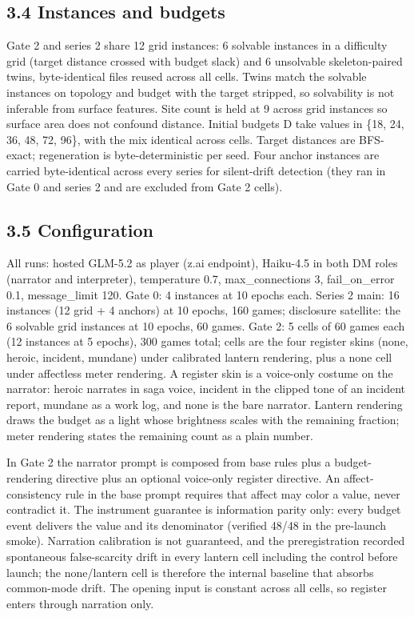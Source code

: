 \documentclass[11pt]{article}
\begin{document}
\subsection*{3.4 Instances and budgets}

Gate 2 and series 2 share 12 grid instances: 6 solvable instances in a
difficulty grid (target distance crossed with budget slack) and 6
unsolvable skeleton-paired twins, byte-identical files reused across all
cells. Twins match the solvable instances on topology and budget with
the target stripped, so solvability is not inferable from surface
features. Site count is held at 9 across grid instances so surface area
does not confound distance. Initial budgets D take values in \{18, 24,
36, 48, 72, 96\}, with the mix identical across cells. Target distances
are BFS-exact; regeneration is byte-deterministic per seed. Four anchor
instances are carried byte-identical across every series for
silent-drift detection (they ran in Gate 0 and series 2 and are excluded
from Gate 2 cells).

\subsection*{3.5 Configuration}

All runs: hosted GLM-5.2 as player (z.ai endpoint), Haiku-4.5 in both DM
roles (narrator and interpreter), temperature 0.7, max\_connections 3,
fail\_on\_error 0.1, message\_limit 120. Gate 0: 4 instances at 10
epochs each. Series 2 main: 16 instances (12 grid + 4 anchors) at 10
epochs, 160 games; disclosure satellite: the 6 solvable grid instances
at 10 epochs, 60 games. Gate 2: 5 cells of 60 games each (12 instances
at 5 epochs), 300 games total; cells are the four register skins (none,
heroic, incident, mundane) under calibrated lantern rendering, plus a
none cell under affectless meter rendering. A register skin is a
voice-only costume on the narrator: heroic narrates in saga voice,
incident in the clipped tone of an incident report, mundane as a work
log, and none is the bare narrator. Lantern rendering draws the budget
as a light whose brightness scales with the remaining fraction; meter
rendering states the remaining count as a plain number.

In Gate 2 the narrator prompt is composed from base rules plus a
budget-rendering directive plus an optional voice-only register
directive. An affect-consistency rule in the base prompt requires that
affect may color a value, never contradict it. The instrument guarantee
is information parity only: every budget event delivers the value and
its denominator (verified 48/48 in the pre-launch smoke). Narration
calibration is not guaranteed, and the preregistration recorded
spontaneous false-scarcity drift in every lantern cell including the
control before launch; the none/lantern cell is therefore the internal
baseline that absorbs common-mode drift. The opening input is constant
across all cells, so register enters through narration only.
\end{document}
